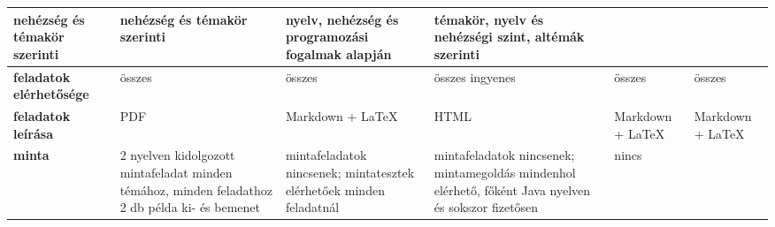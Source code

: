 {\begin{tabularx}{\textwidth}{@{}X|X|X|X|X|X@{}}
        nehézség és témakör szerinti                                                                                &
        nehézség és témakör szerinti                                                                                &
        nyelv, nehézség és programozási fogalmak alapján                                                            &
        témakör, nyelv és nehézségi szint, altémák szerinti                                                           \\ \hline
        \textbf{feladatok elérhetősége}                                                                             &
        összes                                                                                                      &
        összes                                                                                                      &
        összes ingyenes                                                                                             &
        összes                                                                                                      &
        összes                                                                                                        \\ \hline
        \textbf{feladatok leírása}                                                                                  &
        PDF                                                                                                         &
        Markdown + \LaTeX{}                                                                                         &
        HTML                                                                                                        &
        Markdown + \LaTeX{}                                                                                         &
        Markdown + \LaTeX{}                                                                                           \\ \hline
        \textbf{minta}                                                                                              &
        2 nyelven kidolgozott mintafeladat minden témához, minden feladathoz 2 db példa ki- és bemenet              &
        minta\-feladatok nincsenek; mintatesztek elérhetőek minden feladatnál                                       &
        minta\-feladatok nincsenek; mintamegoldás mindenhol elérhető, főként Java nyelven és sokszor fizetősen      &
        nincs                                                                                                       &

\end{tabularx}}
